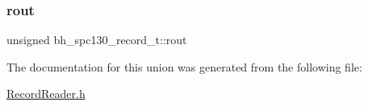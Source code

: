 \mbox{\label{unionbh__spc130__record__t_aecbfa30dcdb602237b62d54024ac2ca5}} 
\subsubsection{\texorpdfstring{rout}{rout}}
{\footnotesize\ttfamily unsigned bh\+\_\+spc130\+\_\+record\+\_\+t\+::rout}



The documentation for this union was generated from the following file\+:\begin{DoxyCompactItemize}
\item 
\hyperlink{_record_reader_8h}{Record\+Reader.\+h}\end{DoxyCompactItemize}
